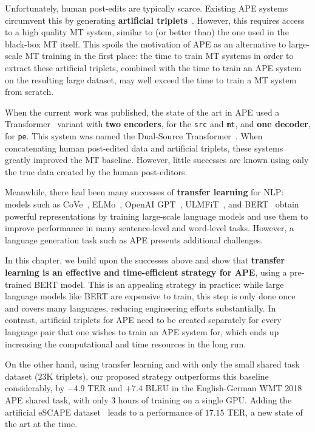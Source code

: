 Unfortunately, human post-edits are typically scarce. Existing APE
systems circumvent this by generating {\bf artificial
        triplets}~\citep{junczys2016log, negri2018escape}. However, this
requires access to a high quality MT system, similar to (or better
than) the one used in the black-box MT itself. This spoils the
motivation of APE as an alternative to large-scale MT training in the
first place: the time to train MT systems in order to extract these
artificial triplets, combined with the time to train an APE system on
the resulting large dataset, may well exceed the time to train a MT
system from scratch.

\begin{sloppypar}
    When the current work was published, the state of the art in APE used
    a Transformer~\citep{vaswani2017attention} variant with {\bf two encoders},
    for the {\tt src} and {\tt mt}, and {\bf one decoder}, for {\tt pe}.
    This system was named the Dual-Source
    Transformer~\citep{junczys2018ms, tebbifakhr2018multi}. When
    concatenating human post-edited data and artificial triplets, these
    systems greatly improved the MT baseline. However, little successes
    are known using only the true data created by the human post-editors.
\end{sloppypar}

Meanwhile, there had been many successes of {\bf transfer learning}
for NLP: models such as CoVe~\citep{mccann2017learned},
ELMo~\citep{peters2018deep}, OpenAI GPT~\citep{radford2018improving},
ULMFiT~\citep{howard2018universal}, and BERT~\citep{devlin2018bert}
obtain powerful representations by training large-scale language
models and use them to improve performance in many sentence-level and
word-level tasks. However, a language generation task such as APE
presents additional challenges.

In this chapter, we build upon the successes above and show that {\bf
        transfer learning is an effective and time-efficient strategy for
        APE}, using a pre-trained BERT model. This is an appealing strategy
in practice: while large language models like BERT are expensive to
train, this step is only done once and covers many languages,
reducing engineering efforts substantially. In contrast, artificial
triplets for APE need to be created separately for every language
pair that one wishes to train an APE system for, which ends up
increasing the computational and time resources in the long run.

On the other hand, using transfer learning and with only the small shared
task dataset ($23$K triplets), our proposed strategy outperforms this
baseline considerably, by $-4.9$ TER and $+7.4$ BLEU in the
English-German WMT 2018 APE shared task, with only 3 hours of training on
a single GPU. Adding the artificial eSCAPE
dataset~\citep{negri2018escape} leads to a performance of $17.15$ TER,
a new state of the art at the time.

